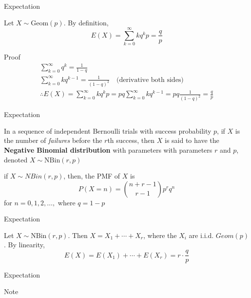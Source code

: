 \documentclass{beamer}
\newcommand{\tb}[1]{\textbf{#1}}
\newcommand{\ti}[1]{\textit{#1}}
\begin{document}
\begin{frame}{Expectation}
    \begin{example}
        Let $X \sim \text{Geom}(p)$. By definition,
        \[
            E(X) = \sum^\infty_{k=0} k q ^k p = \frac{q}{p}
        \]
    \end{example}
    \begin{block}{Proof}
        \[
            \begin{gathered}
                \sum^\infty_{k=0} q^k = \frac{1}{1-q}\\
                \sum^{\infty}_{k=0} kq^{k-1} =\frac{1}{(1-q)^2}\quad \text{(derivative both sides)}\\
                \therefore E(X) = \sum^{\infty}_{k=0} k q^k p = pq \sum^\infty_{k=0} k q^{k-1} = pq \frac{1}{(1-q)^2} = \frac{q}{p}
            \end{gathered}
        \]
    \end{block}
\end{frame}

\begin{frame}{Expectation}
    \begin{definition}
        In a sequence of independent Bernoulli trials with success probability $p$, if $X$ is the number of \ti{failures} before the $r$th success, then $X$ is said to have the \tb{Negative Binomial distribution} with parameters with parameters $r$ and $p$, denoted $X \sim \text{NBin}(r, p)$\newline

        if $X \sim NBin(r,p)$, then, the PMF of $X$ is
        \[
            P(X=n) = \binom{n+r-1}{r-1} p^r q^n
        \]
        for $n=0,1,2, \dots, $ where $q=1-p$
    \end{definition}
\end{frame}

\begin{frame}{Expectation}
    \begin{example}
        Let $X \sim \text{NBin}(r,p)$. Then $X = X_1 + \cdots + X_r$, where the $X_i$ are i.i.d. $Geom(p)$. By linearity, 
        \[
            E(X) = E(X_1) + \cdots + E(X_r) = r \cdot \frac{q}{p}
        \]
    \end{example}
\end{frame}

\begin{frame}{Expectation}
    \begin{block}{Note}

    \end{block}
\end{frame}
\end{document}
